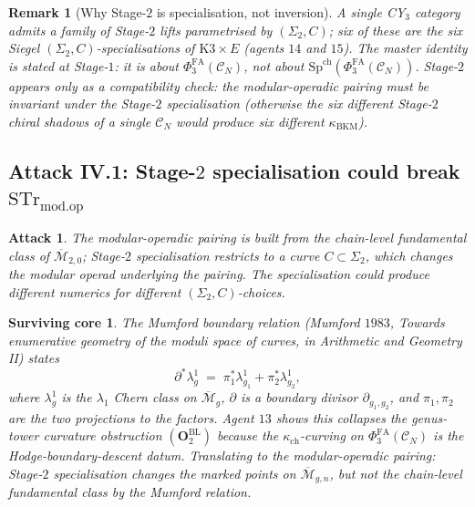 \documentclass[11pt]{amsart}
\newtheorem{remark}[theorem]{Remark}
\newtheorem{attack}[theorem]{Attack}
\newtheorem{surviving}[theorem]{Surviving core}
\providecommand{\cC}{\mathcal{C}}
\providecommand{\PhiFA}{\Phi^{\mathrm{FA}}}
\providecommand{\SpCh}{\mathrm{Sp}^{\mathrm{ch}}}
\providecommand{\Mbar}{\overline{\mathcal{M}}}
\providecommand{\STr}{\mathrm{STr}}
\providecommand{\modop}{\mathrm{mod.op}}
\providecommand{\kBKM}{\kappa_{\mathrm{BKM}}}
\providecommand{\kch}{\kappa_{\mathrm{ch}}}
\begin{document}
\begin{remark}[Why Stage-$2$ is specialisation, not inversion]
A single CY$_3$ category admits a family of Stage-$2$ lifts
parametrised by $(\Sigma_2, C)$; six of these are the six Siegel
$(\Sigma_2, C)$-specialisations of $\mathrm{K3} \times E$ (agents $14$
and $15$). The master identity is stated at Stage-$1$: it is about
$\PhiFA_3(\cC_N)$, not about $\SpCh(\PhiFA_3(\cC_N))$. Stage-$2$
appears only as a compatibility check: the modular-operadic pairing
must be invariant under the Stage-$2$ specialisation (otherwise the
six different Stage-$2$ chiral shadows of a single $\cC_N$ would
produce six different $\kBKM$).
\end{remark}

\subsection{Attack IV.1: Stage-$2$ specialisation could break
$\STr_{\modop}$}

\begin{attack}
\label{att:stage2-breaks}
The modular-operadic pairing is built from the chain-level fundamental
class of $\Mbar_{2, 0}$; Stage-$2$ specialisation restricts to a curve
$C \subset \Sigma_2$, which changes the modular operad underlying the
pairing. The specialisation could produce different numerics for
different $(\Sigma_2, C)$-choices.
\end{attack}

\begin{surviving}
\label{surv:mumford-collapse-ensures-invariance}
The Mumford boundary relation (Mumford $1983$,
\emph{Towards enumerative geometry of the moduli space of curves},
in \emph{Arithmetic and Geometry} II) states
\[
 \partial^* \lambda_g^1 \;=\; \pi_1^* \lambda_{g_1}^1 + \pi_2^* \lambda_{g_2}^1,
\]
where $\lambda_g^1$ is the $\lambda_1$ Chern class on $\Mbar_g$,
$\partial$ is a boundary divisor $\partial_{g_1, g_2}$, and $\pi_1,
\pi_2$ are the two projections to the factors. Agent $13$ shows this
collapses the genus-tower curvature obstruction
$(\mathbf{O}_2^{\mathrm{BL}})$ because the $\kch$-curving on
$\PhiFA_3(\cC_N)$ \emph{is} the Hodge-boundary-descent datum.
Translating to the modular-operadic pairing: Stage-$2$ specialisation
changes the marked points on $\Mbar_{g, n}$, but not the chain-level
fundamental class by the Mumford relation.
\end{surviving}
\end{document}
